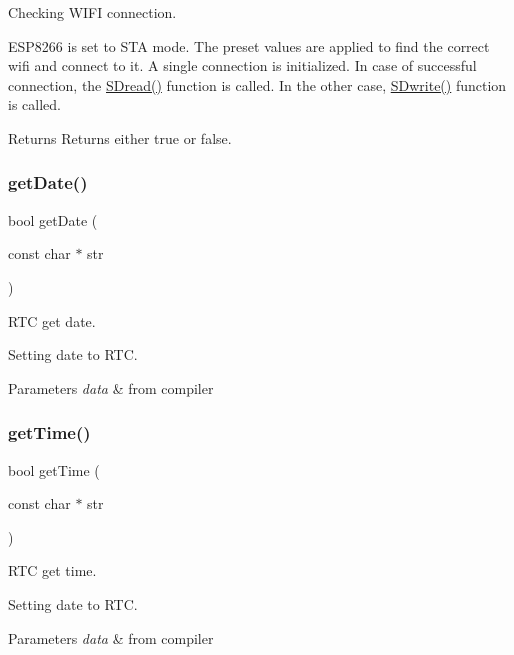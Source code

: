 Checking W\+I\+FI connection. 

E\+S\+P8266 is set to S\+TA mode. The preset values are applied to find the correct wifi and connect to it. A single connection is initialized. In case of successful connection, the \hyperlink{_w_s_8ino_ae25c95c757003a1f2daacee7dae07105}{S\+Dread()} function is called. In the other case, \hyperlink{_w_s_8ino_a5abc7cb0136096487b90a0a7001f1da6}{S\+Dwrite()} function is called. \begin{DoxyReturn}{Returns}
Returns either true or false. 
\end{DoxyReturn}
\mbox{\label{_w_s_8ino_a100af87d91fcaa6f23f2ca6a2fe146cc}} 
\subsubsection{\texorpdfstring{get\+Date()}{getDate()}}
{\footnotesize\ttfamily bool get\+Date (\begin{DoxyParamCaption}\item[{const char $\ast$}]{str }\end{DoxyParamCaption})}



R\+TC get date. 

Setting date to R\+TC. 
\begin{DoxyParams}{Parameters}
{\em data} & from compiler \\
\hline
\end{DoxyParams}
\mbox{\label{_w_s_8ino_ae96ca3df2e8b9eef75d400de6ef06db3}} 
\subsubsection{\texorpdfstring{get\+Time()}{getTime()}}
{\footnotesize\ttfamily bool get\+Time (\begin{DoxyParamCaption}\item[{const char $\ast$}]{str }\end{DoxyParamCaption})}



R\+TC get time. 

Setting date to R\+TC. 
\begin{DoxyParams}{Parameters}
{\em data} & from compiler \\
\hline
\end{DoxyParams}
\mbox{\label{_w_s_8ino_aca85f744646bfbc6d0f732f3b0b938f3}} 
